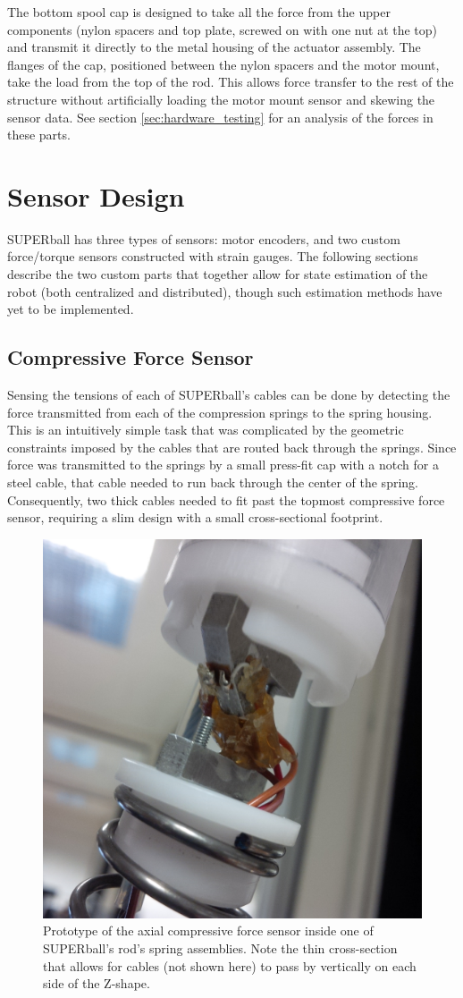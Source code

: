 \documentclass[12pt]{report}
\begin{document}
The bottom spool cap is designed to take all the force from the upper components (nylon spacers and top plate, screwed on with one nut at the top) and transmit it directly to the metal housing of the actuator assembly.
The flanges of the cap, positioned between the nylon spacers and the motor mount, take the load from the top of the rod.
This allows force transfer to the rest of the structure without artificially loading the motor mount sensor and skewing the sensor data.
See section \ref{sec:hardware_testing} for an analysis of the forces in these parts.


\newpage
\section{Sensor Design}

SUPERball has three types of sensors: motor encoders, and two custom force/torque sensors constructed with strain gauges.
The following sections describe the two custom parts that together allow for state estimation of the robot (both centralized and distributed), though such estimation methods have yet to be implemented.

\subsection{Compressive Force Sensor}

Sensing the tensions of each of SUPERball's cables can be done by detecting the force transmitted from each of the compression springs to the spring housing.
This is an intuitively simple task that was complicated by the geometric constraints imposed by the cables that are routed back through the springs.
Since force was transmitted to the springs by a small press-fit cap with a notch for a steel cable, that cable needed to run back through the center of the spring.
Consequently, two thick cables needed to fit past the topmost compressive force sensor, requiring a slim design with a small cross-sectional footprint.

\begin{figure}[thpb]
      \centering
      \includegraphics[width=.5\columnwidth]{img/SUPERball_compressive_gauge.jpg}
      \caption{Prototype of the axial compressive force sensor inside one of SUPERball's rod's spring assemblies. Note the thin cross-section that allows for cables (not shown here) to pass by vertically on each side of the Z-shape.}
      \label{fig:compressive_strain_gauge}
      \vspace{-0.2cm}
\end{figure}
\end{document}
